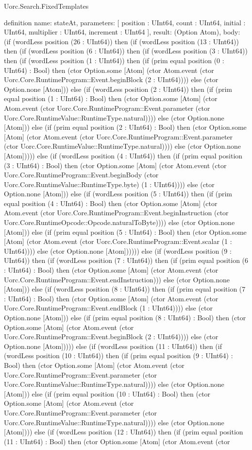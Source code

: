 \begin{lexlean}{Uorc.Search.FixedTemplates}
\begin{semanticmodule}
definition{
  name: stateAt,
  parameters: [
    position : UInt64,
    count : UInt64,
    initial : UInt64,
    multiplier : UInt64,
    increment : UInt64
  ],
  result: (Option Atom),
  body: (if (wordLess position (26 : UInt64)) then (if (wordLess position (13 : UInt64)) then (if (wordLess position (6 : UInt64)) then (if (wordLess position (3 : UInt64)) then (if (wordLess position (1 : UInt64)) then (if (prim equal position (0 : UInt64) : Bool) then (ctor Option.some [Atom] (ctor Atom.event (ctor Uorc.Core.RuntimeProgram::Event.beginBlock (2 : UInt64)))) else (ctor Option.none [Atom])) else (if (wordLess position (2 : UInt64)) then (if (prim equal position (1 : UInt64) : Bool) then (ctor Option.some [Atom] (ctor Atom.event (ctor Uorc.Core.RuntimeProgram::Event.parameter (ctor Uorc.Core.RuntimeValue::RuntimeType.natural)))) else (ctor Option.none [Atom])) else (if (prim equal position (2 : UInt64) : Bool) then (ctor Option.some [Atom] (ctor Atom.event (ctor Uorc.Core.RuntimeProgram::Event.parameter (ctor Uorc.Core.RuntimeValue::RuntimeType.natural)))) else (ctor Option.none [Atom])))) else (if (wordLess position (4 : UInt64)) then (if (prim equal position (3 : UInt64) : Bool) then (ctor Option.some [Atom] (ctor Atom.event (ctor Uorc.Core.RuntimeProgram::Event.beginBody (ctor Uorc.Core.RuntimeValue::RuntimeType.byte) (1 : UInt64)))) else (ctor Option.none [Atom])) else (if (wordLess position (5 : UInt64)) then (if (prim equal position (4 : UInt64) : Bool) then (ctor Option.some [Atom] (ctor Atom.event (ctor Uorc.Core.RuntimeProgram::Event.beginInstruction (ctor Uorc.Core.RuntimeOpcode::Opcode.naturalToByte)))) else (ctor Option.none [Atom])) else (if (prim equal position (5 : UInt64) : Bool) then (ctor Option.some [Atom] (ctor Atom.event (ctor Uorc.Core.RuntimeProgram::Event.scalar (1 : UInt64)))) else (ctor Option.none [Atom]))))) else (if (wordLess position (9 : UInt64)) then (if (wordLess position (7 : UInt64)) then (if (prim equal position (6 : UInt64) : Bool) then (ctor Option.some [Atom] (ctor Atom.event (ctor Uorc.Core.RuntimeProgram::Event.endInstruction))) else (ctor Option.none [Atom])) else (if (wordLess position (8 : UInt64)) then (if (prim equal position (7 : UInt64) : Bool) then (ctor Option.some [Atom] (ctor Atom.event (ctor Uorc.Core.RuntimeProgram::Event.endBlock (1 : UInt64)))) else (ctor Option.none [Atom])) else (if (prim equal position (8 : UInt64) : Bool) then (ctor Option.some [Atom] (ctor Atom.event (ctor Uorc.Core.RuntimeProgram::Event.beginBlock (2 : UInt64)))) else (ctor Option.none [Atom])))) else (if (wordLess position (11 : UInt64)) then (if (wordLess position (10 : UInt64)) then (if (prim equal position (9 : UInt64) : Bool) then (ctor Option.some [Atom] (ctor Atom.event (ctor Uorc.Core.RuntimeProgram::Event.parameter (ctor Uorc.Core.RuntimeValue::RuntimeType.natural)))) else (ctor Option.none [Atom])) else (if (prim equal position (10 : UInt64) : Bool) then (ctor Option.some [Atom] (ctor Atom.event (ctor Uorc.Core.RuntimeProgram::Event.parameter (ctor Uorc.Core.RuntimeValue::RuntimeType.natural)))) else (ctor Option.none [Atom]))) else (if (wordLess position (12 : UInt64)) then (if (prim equal position (11 : UInt64) : Bool) then (ctor Option.some [Atom] (ctor Atom.event (ctor }
\end{semanticmodule}
\end{lexlean}

